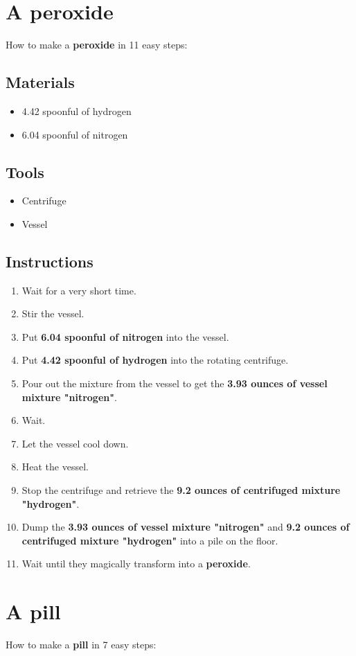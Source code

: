 \documentclass{article}
\begin{document}
\section{A peroxide}How to make a \textbf{peroxide} in 11 easy steps:

\subsection{Materials}\begin{itemize}
\item 
4.42 spoonful of hydrogen
\item 
6.04 spoonful of nitrogen
\end{itemize}
\subsection{Tools}\begin{itemize}
\item 
Centrifuge
\item 
Vessel
\end{itemize}
\subsection{Instructions}\begin{enumerate}
\item 
Wait for a very short time.
\item 
Stir the vessel.
\item 
Put \textbf{6.04 spoonful of nitrogen} into the vessel.
\item 
Put \textbf{4.42 spoonful of hydrogen} into the rotating centrifuge.
\item 
Pour out the mixture from the vessel to get the \textbf{3.93 ounces of vessel mixture "nitrogen"}.
\item 
Wait.
\item 
Let the vessel cool down.
\item 
Heat the vessel.
\item 
Stop the centrifuge and retrieve the \textbf{9.2 ounces of centrifuged mixture "hydrogen"}.
\item 
Dump the \textbf{3.93 ounces of vessel mixture "nitrogen"} and \textbf{9.2 ounces of centrifuged mixture "hydrogen"} into a pile on the floor.
\item 
Wait until they magically transform into a \textbf{peroxide}.
\end{enumerate}
\newpage
\section{A pill}How to make a \textbf{pill} in 7 easy steps:
\end{document}
